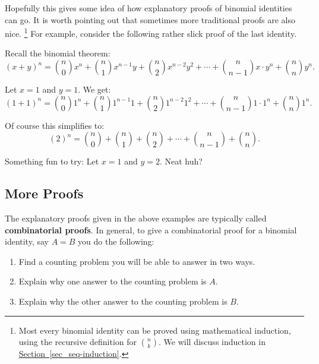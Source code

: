 \documentclass[10pt,]{book}
\newcommand{\terminology}[1]{\textbf{#1}}
\theoremstyle{plain}
\theoremstyle{definition}
\theoremstyle{definition}
\theoremstyle{definition}
\numberwithin{equation}{chapter}
\begin{document}
      Hopefully this gives some idea of how explanatory proofs of binomial identities can go. It is worth pointing out that sometimes more traditional proofs are also nice.
      \footnote{Most every binomial identity can be proved using mathematical induction, using the recursive definition for \({n \choose k}\). We will discuss induction in
        \hyperref[sec_seq-induction]{Section~\ref{sec_seq-induction}}.\label{fn-3}} For example, consider the following rather slick proof of the last identity.
\par

      Recall the binomial theorem:
      \begin{equation*}
        (x + y)^n = {n \choose 0}x^n + {n \choose 1}x^{n-1}y + {n \choose 2}x^{n-2}y^2 + \cdots + {n \choose n-1}x\cdot y^n + {n \choose n}y^n.
      \end{equation*}
\par

      Let \(x = 1\) and \(y = 1\). We get:
      \begin{equation*}
        (1 + 1)^n = {n \choose 0}1^n + {n \choose 1}1^{n-1}1 + {n \choose 2}1^{n-2}1^2 + \cdots + {n \choose n-1}1\cdot 1^n + {n \choose n}1^n.
      \end{equation*}
\par

      Of course this simplifies to:
      \begin{equation*}
        (2)^n = {n \choose 0} + {n \choose 1} + {n \choose 2} + \cdots + {n \choose n-1} + {n \choose n}.
      \end{equation*}
\par

      Something fun to try: Let \(x = 1\) and \(y = 2\). Neat huh?
\typeout{************************************************}
\typeout{************************************************}
\subsection[More Proofs]{More Proofs}\label{subsec_moreProofs}

      The explanatory proofs given in the above examples are typically called \terminology{combinatorial proofs}. In general, to give a combinatorial proof for a binomial identity, say \(A = B\) you do the following:
\leavevmode%
\begin{enumerate}
\item\hypertarget{li-523}{}
      Find a counting problem you will be able to answer in two ways.
\item\hypertarget{li-524}{}
      Explain why one answer to the counting problem is \(A\).
\item\hypertarget{li-525}{}
      Explain why the other answer to the counting problem is \(B\).
\end{enumerate}
\par
\end{document}
